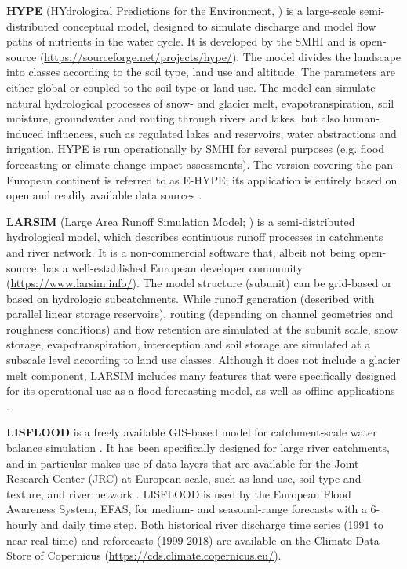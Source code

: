 \documentclass[10pt,a4paper]{article}
\begin{document}
\textbf{HYPE} (HYdrological Predictions for the Environment, \citealp{Lindstrom2010}) is a large-scale semi-distributed conceptual model, designed to simulate discharge and model flow paths of nutrients in the water cycle. It is developed by the SMHI and is open-source (\url{https://sourceforge.net/projects/hype/}). The model divides the landscape into classes according to the soil type, land use and altitude. The parameters are either global or coupled to the soil type or land-use. The model can simulate natural hydrological processes of snow- and glacier melt, evapotranspiration, soil moisture, groundwater and routing through rivers and lakes, but also human-induced influences, such as regulated lakes and reservoirs, water abstractions and irrigation. HYPE is run operationally by SMHI for several purposes (e.g. flood forecasting or climate change impact assessments). The version covering the pan-European continent is referred to as E-HYPE; its application is entirely based on open and readily available data sources \citep[][ \url{https://hypeweb.smhi.se/explore-water/geographical-domains/\#europehype}]{Donnelly2015}.

\textbf{LARSIM} (Large Area Runoff Simulation Model; \citealp{Ludwig2006}) is a semi-distributed hydrological model, which describes continuous runoff processes in catchments and river network. It is a non-commercial software that, albeit not being open-source, has a well-established European developer community (\url{https://www.larsim.info/}). The model structure (subunit) can be grid-based or based on hydrologic subcatchments. While runoff generation (described with parallel linear storage reservoirs), routing (depending on channel geometries and roughness conditions) and flow retention are simulated at the subunit scale, snow storage, evapotranspiration, interception and soil storage are simulated at a subscale level according to land use classes. Although it does not include a glacier melt component, LARSIM includes many features that were specifically designed for its operational use as a flood forecasting model, as well as offline applications \citep{Stahl2017}. 

\textbf{LISFLOOD} is a freely available GIS-based model for catchment-scale water balance simulation \citep[][\url{https://ec-jrc.github.io/lisflood-model/}]{vanDerKniff2010}. It has been specifically designed for large river catchments, and in particular makes use of data layers that are available for the Joint Research Center (JRC) at European scale, such as land use, soil type and texture, and river network \citep{Thielen2009}. LISFLOOD is used by the European Flood Awareness System, EFAS, for medium- and seasonal-range forecasts with a 6-hourly and daily time step. Both historical river discharge time series (1991 to near real-time) and reforecasts (1999-2018) are available on the Climate Data Store of Copernicus (\url{https://cds.climate.copernicus.eu/}). 
\end{document}

